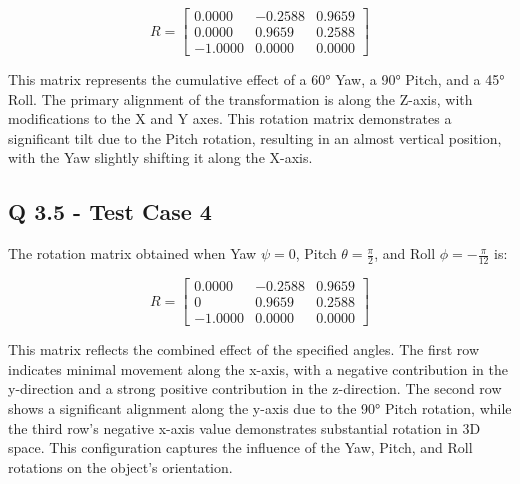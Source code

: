 \[
R = 
\begin{bmatrix}
0.0000 & -0.2588 & 0.9659 \\
0.0000 & 0.9659 & 0.2588 \\
-1.0000 & 0.0000 & 0.0000
\end{bmatrix}
\]

This matrix represents the cumulative effect of a 60° Yaw, a 90° Pitch, and a 45° Roll. The primary alignment of the transformation is along the Z-axis, with modifications to the X and Y axes. This rotation matrix demonstrates a significant tilt due to the Pitch rotation, resulting in an almost vertical position, with the Yaw slightly shifting it along the X-axis.

\subsection{Q 3.5 - Test Case 4}

The rotation matrix obtained when Yaw \( \psi = 0 \), Pitch \( \theta = \frac{\pi}{2} \), and Roll \( \phi = -\frac{\pi}{12} \) is:

\[
R = 
\begin{bmatrix}
0.0000 & -0.2588 & 0.9659 \\
0 & 0.9659 & 0.2588 \\
-1.0000 & 0.0000 & 0.0000
\end{bmatrix}
\]

This matrix reflects the combined effect of the specified angles. The first row indicates minimal movement along the x-axis, with a negative contribution in the y-direction and a strong positive contribution in the z-direction. The second row shows a significant alignment along the y-axis due to the 90° Pitch rotation, while the third row’s negative x-axis value demonstrates substantial rotation in 3D space. This configuration captures the influence of the Yaw, Pitch, and Roll rotations on the object's orientation.
